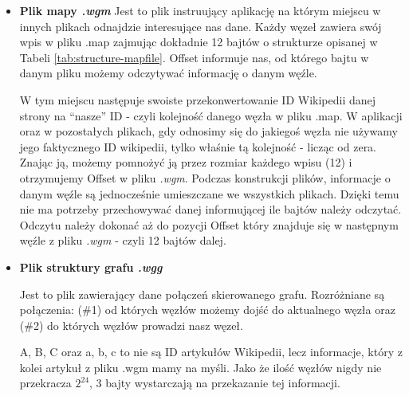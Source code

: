 \begin{itemize}
    \item
\textbf{Plik mapy \textit{.wgm}}\newline
Jest to plik instruujący aplikację na którym miejscu w innych plikach odnajdzie interesujące nas dane.
Każdy węzeł zawiera swój wpis w pliku .map zajmując dokładnie 12 bajtów o strukturze opisanej w Tabeli \ref{tab:structure-mapfile}. Offset informuje nas, od którego bajtu w danym pliku możemy odczytywać informację o danym węźle.


W tym miejscu następuje swoiste przekonwertowanie ID Wikipedii danej strony na “nasze” ID - czyli kolejność danego węzła w pliku .map. W aplikacji oraz w pozostałych plikach, gdy odnosimy się do jakiegoś węzła nie używamy jego faktycznego ID wikipedii, tylko właśnie tą kolejność - licząc od zera. Znając ją, możemy pomnożyć ją przez rozmiar każdego wpisu (12) i otrzymujemy Offset w pliku \textit{.wgm}.
Podczas konstrukcji plików, informacje o danym węźle są jednocześnie umieszczane we wszystkich plikach. Dzięki temu nie ma potrzeby przechowywać danej informującej ile bajtów należy odczytać. Odczytu należy dokonać aż do pozycji Offset który znajduje się w następnym węźle z pliku \textit{.wgm} - czyli 12 bajtów dalej.

\item
\textbf{Plik struktury grafu \textit{.wgg}}

Jest to plik zawierający dane połączeń skierowanego grafu. Rozróżniane są połączenia: (\#1) od których węzłów możemy dojść do aktualnego węzła oraz (\#2) do których węzłów prowadzi nasz węzeł.



A, B, C oraz a, b, c to nie są ID artykułów Wikipedii, lecz informacje, który z kolei artykuł z pliku .wgm mamy na myśli. Jako że ilość węzłów nigdy nie przekracza $2^{24}$, 3 bajty wystarczają na przekazanie tej informacji.


\end{itemize}
